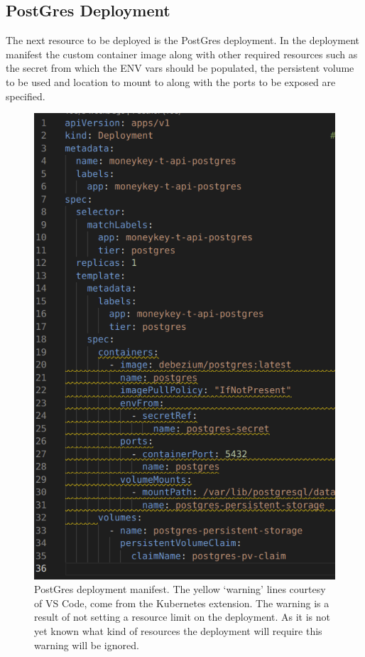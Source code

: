 \begin{flushleft}
    \subsection{PostGres Deployment}
    The next resource to be deployed is the PostGres deployment. In the deployment manifest the custom container image along with other required resources such as the secret from which
    the ENV vars should be populated, the persistent volume to be used and location to mount to along with the ports to be exposed are specified. \newline
    \begin{figure} [ht]
        \begin{center}
            \includegraphics[width=.55\textwidth]{figures/postgres-deployment.png}
            \caption{PostGres deployment manifest. The yellow `warning' lines courtesy of VS Code, come from the Kubernetes extension. The warning is a result of not setting a
                resource limit on the deployment. As it is not yet known what kind of resources the deployment will require this warning will be ignored.}
            \label{fig: 2.9}
        \end{center}
    \end{figure}
    \pagebreak

\end{flushleft}
